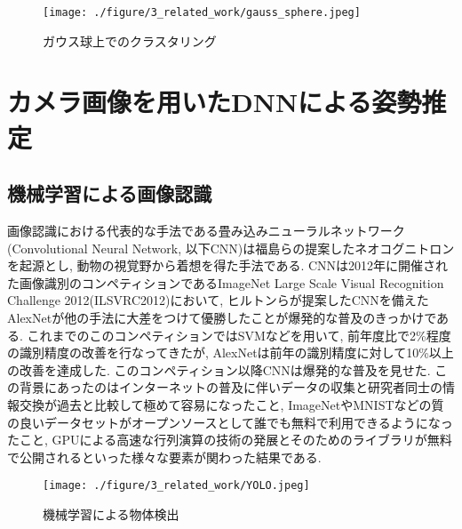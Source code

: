 \begin{figure}[thpb]
  \begin{minipage}[htpb]{1.0\hsize}
  \begin{center}
  \texttt{[image: ./figure/3\_related\_work/gauss\_sphere.jpeg]}
  \caption{ガウス球上でのクラスタリング}
  \label{fig:ozaki_lidar_normal}
  \end{center}
  \end{minipage}
\end{figure}


\section{カメラ画像を用いたDNNによる姿勢推定}
\subsection{機械学習による画像認識}
画像認識における代表的な手法である畳み込みニューラルネットワーク(Convolutional Neural Network, 以下CNN)\cite{CNN_original_paper}は福島らの提案したネオコグニトロン\cite{neocognitron}を起源とし, 動物の視覚野から着想を得た手法である. CNNは2012年に開催された画像識別のコンペティションであるImageNet Large Scale Visual Recognition Challenge 2012(ILSVRC2012)\cite{ILSVRC-2012}において, ヒルトンらが提案したCNNを備えたAlexNet\cite{AlexNet}が他の手法に大差をつけて優勝したことが爆発的な普及のきっかけである. これまでのこのコンペティションではSVM\cite{SVM_original_paper}などを用いて, 前年度比で2\%程度の識別精度の改善を行なってきたが, AlexNetは前年の識別精度に対して10\%以上の改善を達成した. このコンペティション以降CNNは爆発的な普及を見せた. この背景にあったのはインターネットの普及に伴いデータの収集と研究者同士の情報交換が過去と比較して極めて容易になったこと, ImageNet\cite{ImageNet_paper}やMNIST\cite{MNIST_paper}などの質の良いデータセットがオープンソースとして誰でも無料で利用できるようになったこと, GPUによる高速な行列演算\cite{GPU_computing_paper}の技術の発展とそのためのライブラリ\cite{CUDA_paper}が無料で公開されるといった様々な要素が関わった結果である.\par

\begin{figure}[thpb]
  \begin{minipage}[htpb]{1.0\hsize}
  \begin{center}
  \texttt{[image: ./figure/3\_related\_work/YOLO.jpeg]}
  \caption{機械学習による物体検出}
  \label{fig:Object_Detection}
  \end{center}
  \end{minipage}
\end{figure}

